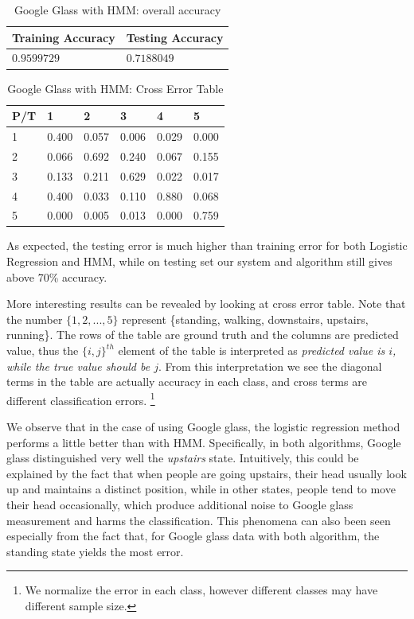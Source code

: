 \begin{itemize}
\begin{table}[h]
\begin{center}
\begin{tabular}{|l|l|}
      \hline
      Training Accuracy & Testing Accuracy\\
      \hline
      $0.9599729$ & $0.7188049$ \\
      \hline
\end{tabular}
\caption{Google Glass with HMM: overall accuracy}
\label{tab:glassHMM1}
\end{center}
\end{table}
\begin{table}[h]
\begin{center}
\begin{tabular}{|l|l|l|l|l|l|}
      \hline
      P/T& 1 & 2 &3 & 4 & 5 \\
      \hline
      1 &0.400&0.057&0.006&0.029&0.000\\
      2 &0.066&0.692&0.240&0.067&0.155\\
      3 &0.133&0.211&0.629&0.022&0.017\\
      4 &0.400&0.033&0.110&0.880&0.068\\
      5 & 0.000&0.005&0.013&0.000&0.759\\
      \hline
\end{tabular}
\caption{Google Glass with HMM: Cross Error Table}
\label{tab:glassHMM2}
\end{center}
\end{table}
\end{itemize}

As expected, the testing error is much higher than training error for both Logistic Regression and HMM, while on testing set our system and algorithm still gives above 70\% accuracy. 

More interesting results can be revealed by looking at cross error table. Note that the number $\{1,2,...,5\}$ represent \{standing, walking, downstairs, upstairs, running\}. The rows of the table are ground truth and the columns are predicted value, thus the $\{i,j\}^{th}$ element of the table is interpreted as \textit{predicted value is $i$, while the true value should be $j$}. From this interpretation we see the diagonal terms in the table are actually accuracy in each class, and cross terms are different classification errors. \footnote{We normalize the error in each class, however different classes may have different sample size.}

We observe that in the case of using Google glass, the logistic regression method performs a little better than with HMM. Specifically, in both algorithms, Google glass distinguished very well the \textit{upstairs} state. Intuitively, this could be explained by the fact that when people are going upstairs, their head usually look up and maintains a distinct position, while in other states, people tend to move their head occasionally, which produce additional noise to Google glass measurement and harms the classification. This phenomena can also been seen especially from the fact that, for Google glass data with both algorithm, the standing state yields the most error.

